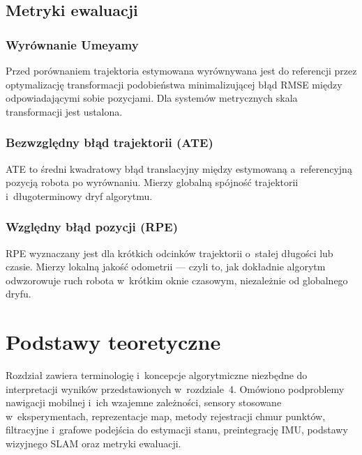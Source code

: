 \section{Metryki ewaluacji}

\subsection{Wyrównanie Umeyamy}

Przed porównaniem trajektoria estymowana wyrównywana jest do referencji przez
optymalizację transformacji podobieństwa minimalizującej błąd RMSE między
odpowiadającymi sobie pozycjami.
Dla systemów metrycznych skala transformacji jest ustalona.

\subsection{Bezwzględny błąd trajektorii (ATE)}

ATE to średni kwadratowy błąd translacyjny między estymowaną a~referencyjną
pozycją robota po wyrównaniu.
Mierzy globalną spójność trajektorii i~długoterminowy dryf algorytmu.

\subsection{Względny błąd pozycji (RPE)}

RPE wyznaczany jest dla krótkich odcinków trajektorii o~stałej długości
lub czasie.
Mierzy lokalną jakość odometrii --- czyli to, jak dokładnie algorytm
odwzorowuje ruch robota w~krótkim oknie czasowym, niezależnie od
globalnego dryfu.



\chapter{Podstawy teoretyczne}

Rozdział zawiera terminologię i~koncepcje algorytmiczne niezbędne do
interpretacji wyników przedstawionych w~rozdziale~4.
Omówiono podproblemy nawigacji mobilnej i~ich wzajemne zależności, sensory
stosowane w~eksperymentach, reprezentacje map, metody rejestracji chmur punktów,
filtracyjne i~grafowe podejścia do estymacji stanu, preintegrację IMU,
podstawy wizyjnego SLAM oraz metryki ewaluacji.

